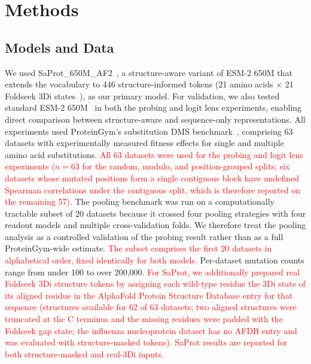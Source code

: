 \documentclass[11pt,a4paper]{article}
\newcommand{\revised}[1]{\textcolor{red}{#1}}
\begin{document}
\section{Methods}

\subsection{Models and Data}

We used SaProt\_650M\_AF2~\cite{su2024saprot}, a structure-aware variant of ESM-2 650M
that extends the vocabulary to 446 structure-informed tokens (21 amino acids $\times$ 21
Foldseek 3Di states~\cite{vankempen2024foldseek}), as our primary model. For validation,
we also tested standard ESM-2 650M~\cite{lin2023evolutionary} in both the probing and
logit lens experiments, enabling direct comparison between structure-aware and
sequence-only representations. All experiments used ProteinGym's substitution DMS
benchmark~\cite{notin2024proteingym}, comprising 63 datasets with experimentally measured
fitness effects for single and multiple amino acid substitutions. \revised{All 63 datasets
were used for the probing and logit lens experiments ($n = 63$ for the random, modulo, and
position-grouped splits; six datasets whose mutated positions form a single contiguous
block have undefined Spearman correlations under the contiguous split, which is therefore
reported on the remaining 57).} The pooling benchmark was run on a computationally tractable subset of
20 datasets because it crossed four pooling strategies with four readout models and
multiple cross-validation folds. We therefore treat the pooling analysis as a
controlled validation of the probing result rather than as a full ProteinGym-wide
estimate. \revised{The subset comprises the first 20 datasets in alphabetical order,
fixed identically for both models.} Per-dataset mutation counts range from under 100 to over 200,000.
\revised{For SaProt, we additionally prepared real Foldseek 3Di structure tokens by
assigning each wild-type residue the 3Di state of its aligned residue in the
AlphaFold Protein Structure Database entry for that sequence (structures available for
62 of 63 datasets; two aligned structures were truncated at the C terminus and the
missing residues were padded with the Foldseek gap state; the influenza nucleoprotein
dataset has no AFDB entry and was evaluated with structure-masked tokens). SaProt
results are reported for both structure-masked and real-3Di inputs.}
\end{document}
